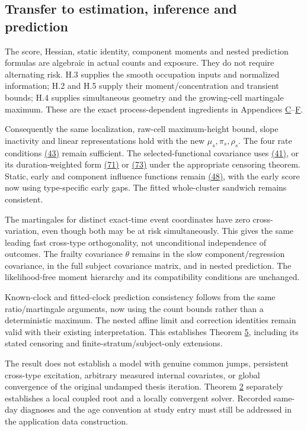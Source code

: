 \documentclass[11pt]{article}
\begin{document}
\subsection{Transfer to estimation, inference and prediction}\label{sec:H.6}

The score, Hessian, static identity, component moments and nested prediction formulas are algebraic in actual counts and exposure. They do not require alternating risk. H.3 supplies the smooth occupation inputs and normalized information; H.2 and H.5 supply their moment/concentration and transient bounds; H.4 supplies simultaneous geometry and the growing-cell martingale maximum. These are the exact process-dependent ingredients in Appendices \hyperref[sec:C]{C}--\hyperref[sec:F]{F}.

Consequently the same localization, raw-cell maximum-height bound, slope inactivity and linear representations hold with the new \(\mu_s,\pi_s,\rho_s\). The four rate conditions \hyperref[eq:43]{(43)} remain sufficient. The selected-functional covariance uses \hyperref[eq:41]{(41)}, or its duration-weighted form \hyperref[eq:71]{(71)} or \hyperref[eq:73]{(73)} under the appropriate censoring theorem. Static, early and component influence functions remain \hyperref[eq:48]{(48)}, with the early score now using type-specific early gaps. The fitted whole-cluster sandwich remains consistent.

The martingales for distinct exact-time event coordinates have zero cross-variation, even though both may be at risk simultaneously. This gives the same leading fast cross-type orthogonality, not unconditional independence of outcomes. The frailty covariance \(\theta\) remains in the slow component/regression covariance, in the full subject covariance matrix, and in nested prediction. The likelihood-free moment hierarchy and its compatibility conditions are unchanged.

Known-clock and fitted-clock prediction consistency follows from the same ratio/martingale arguments, now using the count bounds rather than a deterministic maximum. The nested affine limit and correction identities remain valid with their existing interpretation. This establishes Theorem \hyperref[res:Theorem-5]{5}, including its stated censoring and finite-stratum/subject-only extensions.

The result does not establish a model with genuine common jumps, persistent cross-type excitation, arbitrary measured internal covariates, or global convergence of the original undamped thesis iteration. Theorem \hyperref[res:Theorem-2]{2} separately establishes a local coupled root and a locally convergent solver. Recorded same-day diagnoses and the age convention at study entry must still be addressed in the application data construction.
\end{document}
